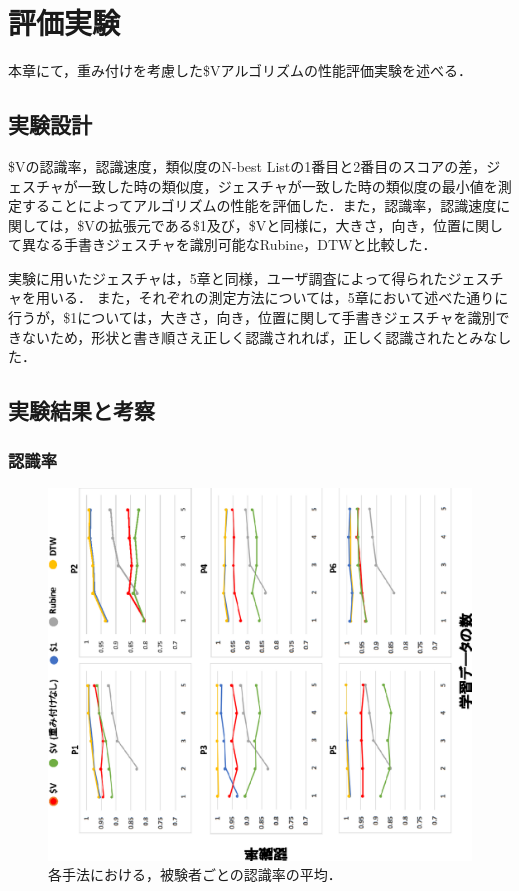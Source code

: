 \chapter{評価実験}
本章にて，重み付けを考慮した\$Vアルゴリズムの性能評価実験を述べる．

\section{実験設計}
\$Vの認識率，認識速度，類似度のN-best Listの1番目と2番目のスコアの差，ジェスチャが一致した時の類似度，ジェスチャが一致した時の類似度の最小値を測定することによってアルゴリズムの性能を評価した．また，認識率，認識速度に関しては，\$Vの拡張元である\$1及び，\$Vと同様に，大きさ，向き，位置に関して異なる手書きジェスチャを識別可能なRubine，DTWと比較した．

実験に用いたジェスチャは，5章と同様，ユーザ調査によって得られたジェスチャを用いる．
また，それぞれの測定方法については，5章において述べた通りに行うが，\$1については，大きさ，向き，位置に関して手書きジェスチャを識別できないため，形状と書き順さえ正しく認識されれば，正しく認識されたとみなした．

\section{実験結果と考察}
\subsection{認識率}
\begin{figure}[!h]
\centering
\includegraphics[width=1.0\columnwidth,angle=-90]{img/rec_rate.eps}
\caption{各手法における，被験者ごとの認識率の平均．}
\label{fig:rec_rate}
\end{figure}

